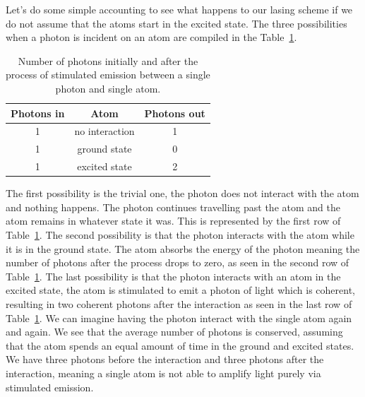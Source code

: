 Let's do some simple accounting to see what happens to our lasing scheme if we do not assume that the atoms start in the excited state.
The three possibilities when a photon is incident  on an atom are compiled in the Table~\ref{tab:5-3_three_possibilities}.
\begin{table}[h]
    \centering
    \begin{tabular}{c|c|c}
        Photons in & Atom & Photons out \\
        \hline
        1 & no interaction & 1 \\
        \hline
        1 & ground state & 0 \\
        1 & excited state & 2 \\
    \end{tabular}
    \caption[Stimulated emission accounting]{Number of photons initially and after the process of stimulated emission between a single photon and single atom.}
    \label{tab:5-3_three_possibilities}
\end{table}
The first possibility is the trivial one, the photon does not interact with the atom and nothing happens.
The photon continues travelling past the atom and the atom remains in whatever state it was.
This is represented by the first row of Table~\ref{tab:5-3_three_possibilities}.
The second possibility is that the photon interacts with the atom while it is in the ground state.
The atom absorbs the energy of the photon meaning the number of photons after the process drops to zero, as seen in the second row of Table~\ref{tab:5-3_three_possibilities}.
The last possibility is that the photon interacts with an atom in the excited state, the atom is stimulated to emit a photon of light which is coherent, resulting in two coherent photons after the interaction as seen in the last row of Table~\ref{tab:5-3_three_possibilities}.
We can imagine having the photon interact with the single atom again and again.
We see that the average number of photons is conserved, assuming that the atom spends an equal amount of time in the ground and excited states.
We have three photons before the interaction and three photons after the interaction, meaning a single atom is not able to amplify light purely via stimulated emission.

